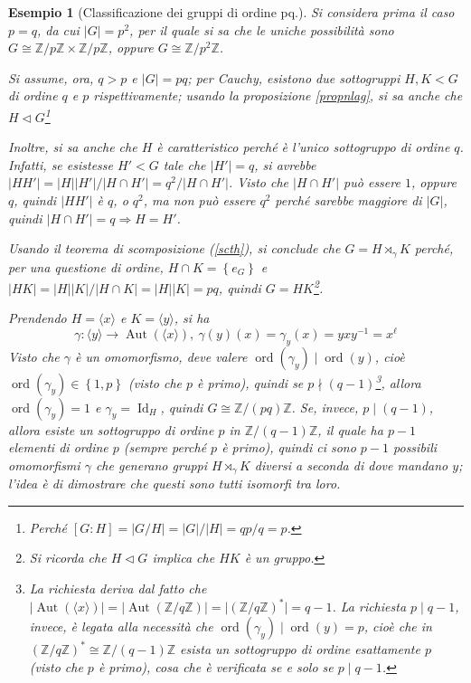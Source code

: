 \documentclass[11pt]{article}
\theoremstyle{style}
\newtheorem{esempio}{Esempio}[section]
\numberwithin{equation}{subsection}
\begin{document}
\begin{esempio}
	[Classificazione dei gruppi di ordine pq.]
	Si considera prima il caso $p=q$, da cui $\lvert G \rvert  = p^2$, per il quale si sa che le uniche possibilit\`a sono $G \cong \mathbb{Z}/p\mathbb{Z} \times \mathbb{Z} / p \mathbb{Z}$, oppure $G\cong\mathbb{Z} / p ^2 \mathbb{Z}$.

	Si assume, ora, $q>p$ e $\lvert G \rvert = pq$; per Cauchy, esistono due sottogruppi $H,K < G$ di ordine $q$ e $p$ rispettivamente; usando la proposizione \ref{propnlag}, si sa anche che $H \lhd G$\footnote{Perch\'e $[G:H] = \lvert G / H \rvert = \lvert G  \rvert / \lvert H \rvert = qp / q =p $.}
	
	Inoltre, si sa anche che $H$ \`e caratteristico perch\'e \`e l'unico sottogruppo di ordine $q$. 
	Infatti, se esistesse $H'<G$ tale che $\lvert H' \rvert =q$, si avrebbe $\lvert H H' \rvert = \lvert H \rvert \lvert H' \rvert  / \lvert H \cap H' \rvert = q^2 / \lvert H\cap H' \rvert $. 
	Visto che $\lvert H\cap H' \rvert $ pu\`o essere $1$, oppure $q$, quindi $\lvert H H' \rvert $ \`e $q$, o $q^2$, ma non pu\`o essere $q^2 $ perch\'e sarebbe maggiore di $\lvert G \rvert $, quindi $\lvert H\cap H' \rvert = q \Rightarrow H = H'$.

	Usando il teorema di scomposizione (\ref{scth}), si conclude che $G = H \rtimes _\gamma K$ perch\'e, per una questione di ordine, $H\cap K = \left\{ e_G \right\} $ e $\lvert HK \rvert = \lvert H \rvert \lvert K \rvert / \lvert H\cap K \rvert = \lvert H  \rvert \lvert K \rvert =pq$, quindi $G = HK$\footnote{Si ricorda che $H\lhd G$ implica che $HK$ \`e un gruppo.}.

	Prendendo $H = \langle x \rangle$ e $ K = \langle y \rangle$, si ha
	\[
	\gamma : \langle y \rangle \longrightarrow \operatorname{Aut} (\langle x \rangle),  \ \gamma(y)(x) = \gamma_y(x) = yxy^{-1}= x^\ell 
	\] 
	Visto che $\gamma$ \`e un omomorfismo, deve valere $\operatorname{ord}(\gamma_y)  \mid \operatorname{ord}(y) $, cio\`e $\operatorname{ord}(\gamma_y) \in \left\{ 1,p \right\} $ (visto che $p$ \`e primo), quindi se $p  \nmid  (q - 1)$\footnote{La richiesta deriva dal fatto che $\lvert \operatorname{Aut} (\langle x \rangle) \rvert = \lvert \operatorname{Aut} (\mathbb{Z}/q\mathbb{Z}) \rvert =\lvert (\mathbb{Z}/q\mathbb{Z})^* \rvert = q - 1$. La richiesta $p  \mid q-1$, invece, \`e legata alla necessit\`a che $\operatorname{ord}(\gamma_y)  \mid \operatorname{ord}(y) =p$, cio\`e che in $(\mathbb{Z}/q\mathbb{Z})^*\cong \mathbb{Z}/(q-1)\mathbb{Z}$ esista un sottogruppo di ordine esattamente $p$ (visto che $p$ \`e primo), cosa che \`e verificata se e solo se $p  \mid q-1$.}, allora $\operatorname{ord}(\gamma_y) =1$ e $\gamma_y = \operatorname{Id} _H$, quindi $G \cong \mathbb{Z}/(pq) \mathbb{Z}$.
	Se, invece, $p \mid (q-1)$, allora esiste un sottogruppo di ordine $p$ in $\mathbb{Z}/(q-1)\mathbb{Z}$, il quale ha $p-1$ elementi di ordine $p$ (sempre perch\'e $p$ \`e primo), quindi ci sono $p-1$ possibili omomorfismi $\gamma$ che generano gruppi $H \rtimes _\gamma K$ diversi a seconda di dove mandano $y$; l'idea \`e di dimostrare che questi sono tutti isomorfi tra loro.


\end{esempio}
\end{document}
